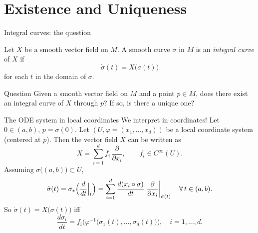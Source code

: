 \documentclass[10pt]{beamer}
\begin{document}
\section{Existence and Uniqueness}

\begin{frame}{Integral curves: the question}
	\begin{definition}
		Let $X$ be a smooth vector field on $M$. A smooth curve
		$\sigma$ in $M$ is an \emph{integral curve} of $X$ if
		\[
			\dot{\sigma}(t) = X\bigl(\sigma(t)\bigr)
		\]
		for each $t$ in the domain of $\sigma$.
	\end{definition}
	\medskip
	\begin{block}{Question}
		Given a smooth vector field on $M$ and a point $p \in M$, does
		there exist an integral curve of $X$ through $p$? If so, is
		there a unique one?
	\end{block}
\end{frame}

\begin{frame}{The ODE system in local coordinates}
	We interpret in coordinates! Let $0 \in (a,b)$, $p = \sigma(0)$.
	Let $(U, \varphi = (x_1, \dots, x_d))$ be a local coordinate system
	(centered at $p$). Then the vector field $X$ can be written as
	\[
		X = \sum_{i=1}^{d} f_i\, \frac{\partial}{\partial x_i},
		\qquad f_i \in C^\infty(U).
	\]
	Assuming $\sigma\bigl((a,b)\bigr) \subset U$,
	\[
		\dot{\sigma}(t) = \sigma_*\Bigl( \frac{d}{dt} \Big|_{t} \Bigr)
		= \sum_{i=1}^{d} \frac{d (x_i \circ \sigma)}{dt}
		\left. \frac{\partial}{\partial x_i} \right|_{\sigma(t)}
		\quad \forall\, t \in (a,b).
	\]
	So $\dot{\sigma}(t) = X\bigl(\sigma(t)\bigr)$ iff
	\[
		\frac{d \sigma_i}{dt}
		= f_i\bigl( \varphi^{-1}\bigl( \sigma_1(t), \dots,
		\sigma_d(t) \bigr) \bigr),
		\quad i = 1, \dots, d . \tag{1}
	\]
\end{frame}
\end{document}
